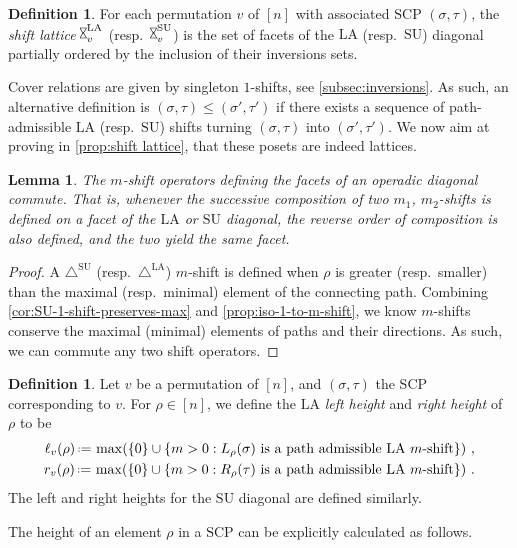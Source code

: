 \documentclass{amsart}
\newcommand{\darkblue}{\color{darkblue}} %
\newtheorem{lemma}[theorem]{Lemma}
\theoremstyle{definition}
\newtheorem{definition}[theorem]{Definition}
\newcommand{\eqdef}{\mbox{\,\raisebox{0.2ex}{\scriptsize\ensuremath{\mathrm:}}\ensuremath{=}\,}} %
\newcommand{\resp}{resp.~} %
\newcommand{\defn}[1]{\textsl{\darkblue #1}} %
\newcommand{\SU}{\mathrm{SU}}
\newcommand{\LA}{\mathrm{LA}}
\newcommand{\SUD}{\triangle^{\mathrm{SU}}}
\newcommand{\LAD}{\triangle^{\mathrm{LA}}}
\newcommand{\SCP}{\mathrm{SCP}}
\newcommand{\hour}{\raisebox{0.065cm}{\rotatebox[origin=c]{90}{$\bowtie$}}_v}
\begin{document}
\begin{definition}
\label{def:shift-lattice}
For each permutation $v$ of $[n]$ with associated $\SCP$ $(\sigma,\tau)$, the \defn{shift lattice} $\hour^\LA$ (\resp $\hour^\SU$) is the set of facets of the $\LA$ (\resp $\SU$) diagonal partially ordered by the inclusion of their inversions sets. 
\end{definition}

Cover relations are given by singleton $1$-shifts, see \cref{subsec:inversions}.
As such, an alternative definition is $(\sigma,\tau)\leq (\sigma',\tau')$ if there exists a sequence of path-admissible $\LA$ (\resp $\SU$) shifts turning $(\sigma,\tau)$ into $(\sigma',\tau')$.
We now aim at proving in \cref{prop:shift lattice}, that these posets are indeed lattices.

\begin{lemma}
\label{lem:m-shifts commute}
The $m$-shift operators defining the facets of an operadic diagonal commute. 
That is, whenever the successive composition of two $m_1$, $m_2$-shifts is defined on a facet of the $\LA$ or $\SU$ diagonal, the reverse order of composition is also defined, and the two yield the same facet. 
\end{lemma}
\begin{proof}
A $\SUD$ (\resp $\LAD$) $m$-shift is defined when $\rho$ is greater (\resp smaller) than the maximal (\resp minimal) element of the connecting path.
Combining \cref{cor:SU-1-shift-preserves-max} and \cref{prop:iso-1-to-m-shift}, we know $m$-shifts conserve the maximal (minimal) elements of paths and their directions.
As such, we can commute any two shift operators.
\end{proof}

\begin{definition}
Let $v$ be a permutation of $[n]$, and $(\sigma,\tau)$ the SCP corresponding to $v$.
For $\rho \in [n]$, we define the $\LA$ \defn{left height} and \defn{right height} of $\rho$ to be 
\begin{align*}
	\ell_v(\rho) \eqdef \max (\{0\}\cup \{m>0: L_{\rho}(\sigma) \text{ is a path admissible $\LA$ $m$-shift} \}) \ , \\
	r_v(\rho) \eqdef \max (\{0\}\cup \{m>0: R_{\rho}(\tau) \text{ is a path admissible $\LA$ $m$-shift} \}) \ .
\end{align*}
The left and right heights for the $\SU$ diagonal are defined similarly. 
\end{definition}

The height of an element $\rho$ in a $\SCP$ can be explicitly calculated as follows. 
\end{document}
